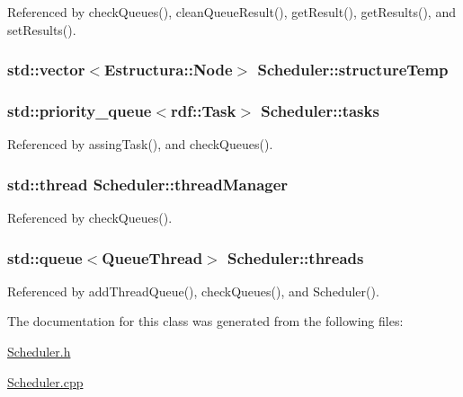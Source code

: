 Referenced by check\+Queues(), clean\+Queue\+Result(), get\+Result(), get\+Results(), and set\+Results().

\subsubsection[{\texorpdfstring{structure\+Temp}{structureTemp}}]{\setlength{\rightskip}{0pt plus 5cm}std\+::vector$<${\bf Estructura\+::\+Node}$>$ Scheduler\+::structure\+Temp\hspace{0.3cm}{\ttfamily [private]}}\hypertarget{classScheduler_a0603b1b04040b5e71cf3a945a1ec09b9}{}\label{classScheduler_a0603b1b04040b5e71cf3a945a1ec09b9}
\subsubsection[{\texorpdfstring{tasks}{tasks}}]{\setlength{\rightskip}{0pt plus 5cm}std\+::priority\+\_\+queue$<${\bf rdf\+::\+Task}$>$ Scheduler\+::tasks\hspace{0.3cm}{\ttfamily [private]}}\hypertarget{classScheduler_adbcdf6edd31a2e8e088eb5bc91b4465e}{}\label{classScheduler_adbcdf6edd31a2e8e088eb5bc91b4465e}


Referenced by assing\+Task(), and check\+Queues().

\subsubsection[{\texorpdfstring{thread\+Manager}{threadManager}}]{\setlength{\rightskip}{0pt plus 5cm}std\+::thread Scheduler\+::thread\+Manager\hspace{0.3cm}{\ttfamily [private]}}\hypertarget{classScheduler_ad1cbfa2210145f7d50c2648845707e68}{}\label{classScheduler_ad1cbfa2210145f7d50c2648845707e68}


Referenced by check\+Queues().

\subsubsection[{\texorpdfstring{threads}{threads}}]{\setlength{\rightskip}{0pt plus 5cm}std\+::queue$<${\bf Queue\+Thread}$>$ Scheduler\+::threads\hspace{0.3cm}{\ttfamily [private]}}\hypertarget{classScheduler_a99f7fcd7cb3977cb7e76232a01aceffe}{}\label{classScheduler_a99f7fcd7cb3977cb7e76232a01aceffe}


Referenced by add\+Thread\+Queue(), check\+Queues(), and Scheduler().



The documentation for this class was generated from the following files\+:\begin{DoxyCompactItemize}
\item 
\hyperlink{Scheduler_8h}{Scheduler.\+h}\item 
\hyperlink{Scheduler_8cpp}{Scheduler.\+cpp}\end{DoxyCompactItemize}
